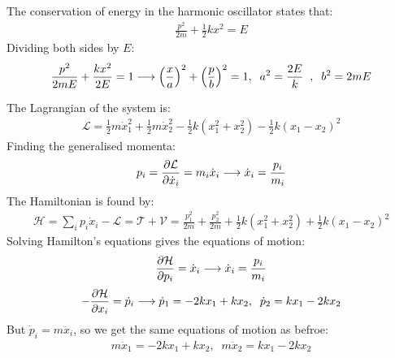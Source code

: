 \documentclass{report}
\theoremstyle{definition}
\begin{document}
\begin{chapter2}\label{prob: 5}
	
\end{chapter2}

\begin{chapter2}\label{prob: 6}
	The conservation of energy in the harmonic oscillator states that:
		\begin{gather*}
			\frac{p^2}{2m} + \frac{1}{2}kx^2 = E
		\end{gather*}
		Dividing both sides by $E$:
		\begin{gather*}
			\frac{p^2}{2mE} + \frac{kx^2}{2E}= 1 \longrightarrow \pqty{\frac{x}{a}}^2 + \pqty{\frac{p}{b}}^2 = 1, \;\; a^2 = \frac{2E}{k}\;\;, \;\;b^2 = 2mE
		\end{gather*}
\end{chapter2}

\begin{chapter2}\label{prob: 7}
	The Lagrangian of the system is:
		\begin{gather*}
			\mathcal{L} = \frac{1}{2}m{\dot x}^2_1 + \frac{1}{2}m{\dot x}^2_2 - \frac{1}{2}k(x^2_1 + x^2_2) - \frac{1}{2}k(x_1 - x_2)^2
		\end{gather*}
		Finding the generalised momenta:
		\begin{gather*}
			p_i = \pdv{\mathcal{L}}{\dot x_i} = m_i \dot x_i \longrightarrow \dot x_i = \frac{p_i}{m_i}
		\end{gather*}
		The Hamiltonian is found by:
		\begin{gather*}
			\mathcal{H} = \sum_i p_i \dot x_i - \mathcal{L} = \mathcal{T+V} = \frac{p^2_1}{2m} + \frac{p^2_2}{2m} + \frac{1}{2}k(x^2_1 + x^2_2) + \frac{1}{2}k(x_1 - x_2)^2
		\end{gather*}
		Solving Hamilton's equations gives the equations of motion:
		\begin{gather*}
			\pdv{\mathcal{H}}{p_i} = \dot x_i \longrightarrow \dot x_i = \frac{p_i}{m_i}
	 	\end{gather*}
	 	\begin{gather*}
	 		-\pdv{\mathcal{H}}{x_i} = \dot p_i \longrightarrow \dot p_1 = - 2kx_1 + kx_2, \;\; \dot p_2 = kx_1 - 2kx_2
	 	\end{gather*}
	 	But $\dot p_i = m\ddot x_i$, so we get the same equations of motion as befroe:
	 	\begin{gather*}
	 		m\ddot x_1 = -2kx_1 + kx_2, \;\; m\ddot x_2 = kx_1 - 2kx_2
	 	\end{gather*}		
\end{chapter2}
\end{document}
